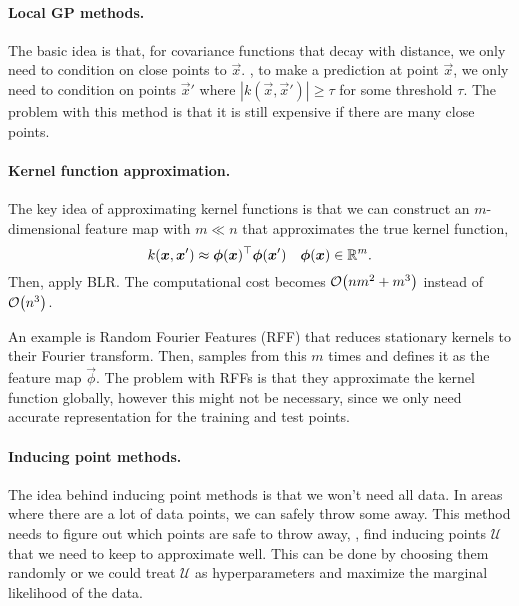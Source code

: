 \paragraph{Local GP methods.}

The basic idea is that, for covariance functions that decay with
distance, we only need to condition on close points to $\vec{x}$.
\Ie, to make a prediction at point $\vec{x}$, we only need to condition on
points $\vec{x}'$ where $|k(\vec{x},\vec{x}')|\geq \tau$ for some threshold
$\tau$. The problem with this method is that it is still expensive if there
are many close points.

\paragraph{Kernel function approximation.}

The key idea of approximating kernel functions is that we can construct an
$m$-dimensional feature map with $m \ll n$ that approximates the true kernel
function, \[
  k(\bm{x},\bm{x}')\approx \bm{\phi}(\bm{x})^\top \bm{\phi}(\bm{x}') \hspace{1em} \bm{\phi}(\bm{x})\in\mathbb{R}^m.
\]
Then, apply BLR. The computational cost becomes $\bigo{nm^2 + m^3}$ instead of
$\bigo{n^3}$.

An example is Random Fourier Features (RFF) that reduces stationary kernels to
their Fourier transform. Then, samples from this $m$ times and defines it as
the feature map $\vec{\phi}$. The problem with RFFs is that they approximate
the kernel function globally, however this might not be necessary, since we
only need accurate representation for the training and test points.

\paragraph{Inducing point methods.}

The idea behind inducing point methods is that we won't need all data. In areas
where there are a lot of data points, we can safely throw some away. This
method needs to figure out which points are safe to throw away, \ie, find
inducing points $\mathcal{U}$ that we need to keep to approximate well. This
can be done by choosing them randomly or we could treat $\mathcal{U}$ as
hyperparameters and maximize the marginal likelihood of the data.
